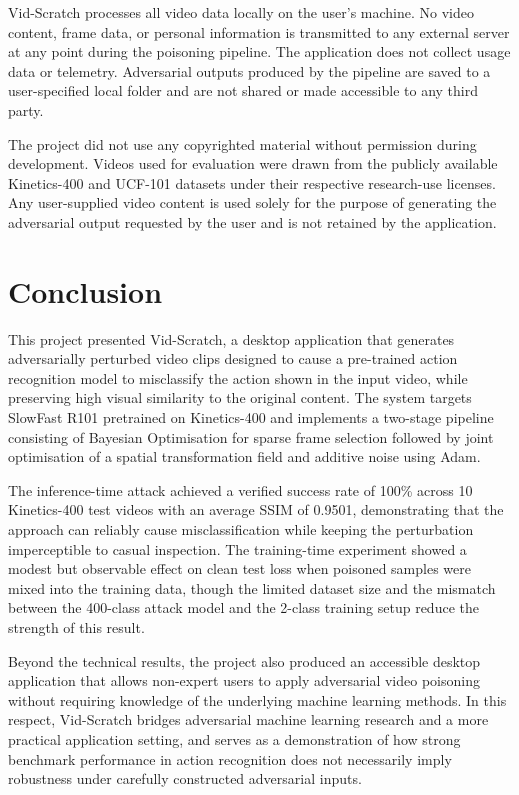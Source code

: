 Vid-Scratch processes all video data locally on the
user's machine. No video content, frame data, or
personal information is transmitted to any external
server at any point during the poisoning pipeline.
The application does not collect usage data or
telemetry. Adversarial outputs produced by the
pipeline are saved to a user-specified local folder
and are not shared or made accessible to any third
party.

The project did not use any copyrighted material
without permission during development. Videos used
for evaluation were drawn from the publicly available
Kinetics-400 and UCF-101 datasets under their
respective research-use licenses. Any user-supplied
video content is used solely for the purpose of
generating the adversarial output requested by the
user and is not retained by the application.

\section{Conclusion}
\label{section:conclusion}

This project presented Vid-Scratch, a desktop
application that generates adversarially perturbed
video clips designed to cause a pre-trained action
recognition model to misclassify the action shown
in the input video, while preserving high visual
similarity to the original content. The system
targets SlowFast R101 pretrained on Kinetics-400
and implements a two-stage pipeline consisting of
Bayesian Optimisation for sparse frame selection
followed by joint optimisation of a spatial
transformation field and additive noise using Adam.

The inference-time attack achieved a verified
success rate of 100\% across 10 Kinetics-400 test
videos with an average SSIM of 0.9501, demonstrating
that the approach can reliably cause misclassification
while keeping the perturbation imperceptible to
casual inspection. The training-time experiment
showed a modest but observable effect on clean
test loss when poisoned samples were mixed into
the training data, though the limited dataset
size and the mismatch between the 400-class attack
model and the 2-class training setup reduce the
strength of this result.

Beyond the technical results, the project also
produced an accessible desktop application that
allows non-expert users to apply adversarial
video poisoning without requiring knowledge of
the underlying machine learning methods. In this
respect, Vid-Scratch bridges adversarial machine
learning research and a more practical application
setting, and serves as a demonstration of how
strong benchmark performance in action recognition
does not necessarily imply robustness under
carefully constructed adversarial inputs.


